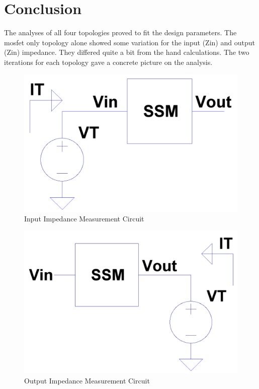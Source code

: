 \documentclass[conference]{IEEEtran}
\begin{document}
\section{Conclusion}
The analyses of all four topologies proved to fit the design parameters. The mosfet only topology alone
showed some variation for the input (Zin) and output (Zin) impedance. They differed quite a bit from the
hand calculations. The two iterations for each topology gave a concrete picture on the analysis.

\clearpage
\onecolumn
\appendix
\label{app:A}
\begin{figure}[!htbp]
  	\centering
  	\includegraphics[scale=0.15]{images/input-z-meas.png}
  	\caption[input-z-meas]{Input Impedance Measurement Circuit}
  	\label{fig:input-z-meas}
	\end{figure}

\begin{figure}[!htbp]
  	\centering
  	\includegraphics[scale=0.15]{images/output-z-meas.png}
  	\caption[output-z-meas]{Output Impedance Measurement Circuit}
  	\label{fig:output-z-meas}
	\end{figure}
\end{document}
